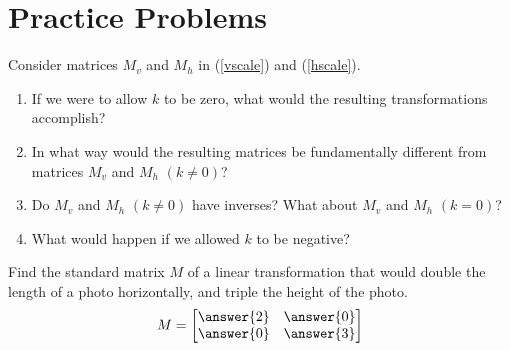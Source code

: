 \documentclass{ximera}
\begin{document}
\section*{Practice Problems}
\begin{problem}\label{prob:k0}
Consider matrices $M_v$ and $M_h$ in (\ref{vscale}) and (\ref{hscale}).  
\begin{enumerate}
\item
If we were to allow $k$ to be zero, what would the resulting transformations accomplish?  
\item In what way would the resulting matrices be fundamentally different from matrices $M_v$ and $M_h$ $(k\neq 0)$?  
\item Do $M_v$ and $M_h$ $(k\neq 0)$ have inverses?  What about $M_v$ and $M_h$ $(k= 0)$?  
\item What would happen if we allowed $k$ to be negative?
\end{enumerate}
\end{problem}

\begin{problem} Find the standard matrix $M$ of a linear transformation that would double the length of a photo horizontally, and triple the height of the photo.
$$M=\begin{bmatrix}\answer{2} & \answer{0}\\\answer{0} & \answer{3}\end{bmatrix}$$
\end{problem}
\end{document}
